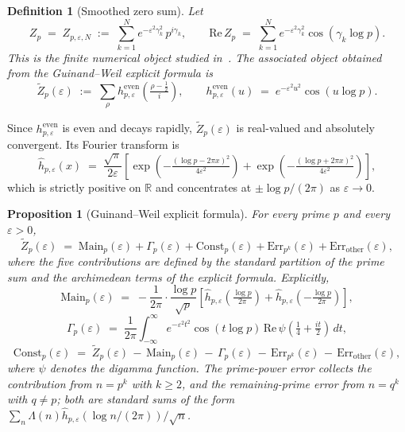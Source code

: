 \documentclass[11pt]{article}
\newtheorem{proposition}[theorem]{Proposition}
\newtheorem{definition}[theorem]{Definition}
\newcommand{\Zt}{\widetilde{Z}}
\begin{document}
\begin{definition}[Smoothed zero sum]
\label{def:smoothed}
Let
\[
Z_p \;=\; Z_{p,\varepsilon,N} \;:=\; \sum_{k=1}^{N} e^{-\varepsilon^2\gamma_k^2}\,
p^{i\gamma_k},
\qquad
\mathrm{Re}\,Z_p \;=\; \sum_{k=1}^{N} e^{-\varepsilon^2\gamma_k^2}
                        \cos(\gamma_k\log p).
\]
This is the finite numerical object studied in~\cite{Paper4,Paper5}.
The associated object obtained from the Guinand--Weil explicit formula is
\[
\Zt_p(\varepsilon) \;:=\; \sum_{\rho} h^{\mathrm{even}}_{p,\varepsilon}
\!\left(\tfrac{\rho-\tfrac12}{i}\right),
\qquad
h^{\mathrm{even}}_{p,\varepsilon}(u) \;=\; e^{-\varepsilon^2 u^2}
                                            \cos(u\log p).
\]
\end{definition}

Since $h^{\mathrm{even}}_{p,\varepsilon}$ is even and decays rapidly,
$\Zt_p(\varepsilon)$ is real-valued and absolutely convergent.
Its Fourier transform is
\[
\widehat{h}_{p,\varepsilon}(x) \;=\; \frac{\sqrt{\pi}}{2\varepsilon}
\!\left[\exp\!\left(-\tfrac{(\log p-2\pi x)^2}{4\varepsilon^2}\right)
      +\exp\!\left(-\tfrac{(\log p+2\pi x)^2}{4\varepsilon^2}\right)
\right],
\]
which is strictly positive on $\mathbb R$ and concentrates at
$\pm\log p/(2\pi)$ as $\varepsilon\to 0$.

\begin{proposition}[Guinand--Weil explicit formula]
\label{prop:gw}
For every prime $p$ and every $\varepsilon>0$,
\[
\Zt_p(\varepsilon) \;=\; \mathrm{Main}_p(\varepsilon)
                       + \Gamma_p(\varepsilon)
                       + \mathrm{Const}_p(\varepsilon)
                       + \mathrm{Err}_{p^k}(\varepsilon)
                       + \mathrm{Err}_{\mathrm{other}}(\varepsilon),
\]
where the five contributions are defined by the standard partition of
the prime sum and the archimedean terms of the explicit formula.
Explicitly,
\[
\mathrm{Main}_p(\varepsilon) \;=\; -\frac{1}{2\pi}\cdot\frac{\log p}{\sqrt p}
\!\left[\widehat{h}_{p,\varepsilon}\!\left(\tfrac{\log p}{2\pi}\right)
      +\widehat{h}_{p,\varepsilon}\!\left(-\tfrac{\log p}{2\pi}\right)
\right],
\]
\[
\Gamma_p(\varepsilon) \;=\; \frac{1}{2\pi}\int_{-\infty}^{\infty}
e^{-\varepsilon^2 t^2}\cos(t\log p)\,
\mathrm{Re}\,\psi\!\left(\tfrac14 + \tfrac{it}{2}\right)\,dt,
\]
\[
\mathrm{Const}_p(\varepsilon) \;=\; \Zt_p(\varepsilon)
\,-\, \mathrm{Main}_p(\varepsilon)
\,-\, \Gamma_p(\varepsilon)
\,-\, \mathrm{Err}_{p^k}(\varepsilon)
\,-\, \mathrm{Err}_{\mathrm{other}}(\varepsilon),
\]
where $\psi$ denotes the digamma function.
The prime-power error collects the contribution from $n=p^k$ with
$k\ge 2$, and the remaining-prime error from $n=q^k$ with $q\neq p$;
both are standard sums of the form
$\sum_n\Lambda(n)\widehat{h}_{p,\varepsilon}(\log n/(2\pi))/\sqrt n$.
\end{proposition}
\end{document}
